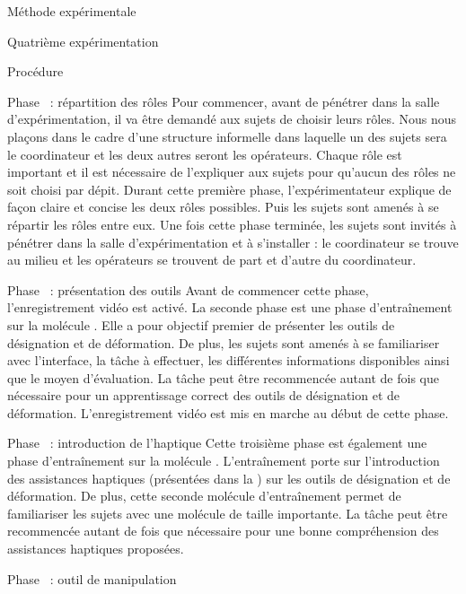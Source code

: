 \documentclass[myfrancais]{mythesis}
\begin{document}
\begin{mychapter}{Méthode expérimentale}
\begin{mysection}{Quatrième expérimentation}
\begin{mysubsection}{Procédure}
\begin{myparagraph}{Phase~ : répartition des rôles}
					Pour commencer, avant de pénétrer dans la salle d'expérimentation, il va être demandé aux sujets de choisir leurs rôles.
					Nous nous plaçons dans le cadre d'une structure informelle dans laquelle un des sujets sera le coordinateur et les deux autres seront les opérateurs.
					Chaque rôle est important et il est nécessaire de l'expliquer aux sujets pour qu'aucun des rôles ne soit choisi par dépit.
					Durant cette première phase, l'expérimentateur explique de façon claire et concise les deux rôles possibles.
					Puis les sujets sont amenés à se répartir les rôles entre eux.
					Une fois cette phase terminée, les sujets sont invités à pénétrer dans la salle d'expérimentation et à s'installer : le coordinateur se trouve au milieu et les opérateurs se trouvent de part et d'autre du coordinateur.
				\end{myparagraph}
				\begin{myparagraph}{Phase~ : présentation des outils}
					Avant de commencer cette phase, l'enregistrement vidéo est activé.
					La seconde phase est une phase d'entraînement sur la molécule \myTRPCAGE.
					Elle a pour objectif premier de présenter les outils de désignation et de déformation.
					De plus, les sujets sont amenés à se familiariser avec l'interface, la tâche à effectuer, les différentes informations disponibles ainsi que le moyen d'évaluation.
					La tâche peut être recommencée autant de fois que nécessaire pour un apprentissage correct des outils de désignation et de déformation.
					L'enregistrement vidéo est mis en marche au début de cette phase.
				\end{myparagraph}
				\begin{myparagraph}{Phase~ : introduction de l'haptique}
					Cette troisième phase est également une phase d'entraînement sur la molécule \myPrion.
					L'entraînement porte sur l'introduction des assistances haptiques (présentées dans la ) sur les outils de désignation et de déformation.
					De plus, cette seconde molécule d'entraînement permet de familiariser les sujets avec une molécule de taille importante.
					La tâche peut être recommencée autant de fois que nécessaire pour une bonne compréhension des assistances haptiques proposées.
				\end{myparagraph}
				\begin{myparagraph}{Phase~ : outil de manipulation}

\end{myparagraph}
\end{mysubsection}
\end{mysection}
\end{mychapter}
\end{document}
